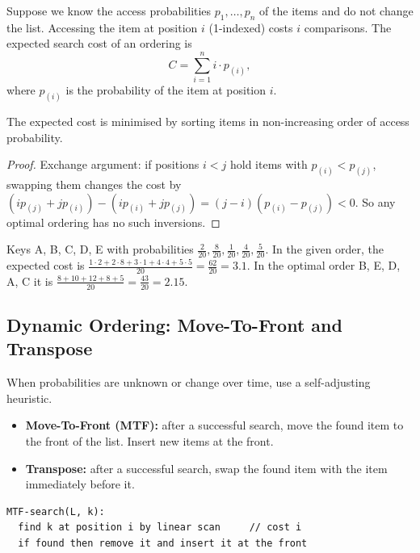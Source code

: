 Suppose we know the access probabilities $p_1, \ldots, p_n$ of the items and do
not change the list. Accessing the item at position $i$ (1-indexed) costs $i$
comparisons. The expected search cost of an ordering is
\[
C = \sum_{i=1}^n i \cdot p_{(i)},
\]
where $p_{(i)}$ is the probability of the item at position $i$.

\begin{theorem}
The expected cost is minimised by sorting items in non-increasing order of
access probability.
\end{theorem}
\begin{proof}
Exchange argument: if positions $i < j$ hold items with $p_{(i)} < p_{(j)}$,
swapping them changes the cost by
$(i p_{(j)} + j p_{(i)}) - (i p_{(i)} + j p_{(j)}) = (j - i)(p_{(i)} - p_{(j)}) < 0$.
So any optimal ordering has no such inversions.
\end{proof}

\begin{example}
Keys A, B, C, D, E with probabilities $\frac2{20}, \frac8{20}, \frac1{20},
\frac{4}{20}, \frac{5}{20}$. In the given order, the expected cost is
$\frac{1\cdot 2 + 2\cdot 8 + 3 \cdot 1 + 4 \cdot 4 + 5\cdot 5}{20} = \frac{62}{20} = 3.1$.
In the optimal order B, E, D, A, C it is
$\frac{8 + 10 + 12 + 8 + 5}{20} = \frac{43}{20} = 2.15$.
\end{example}

\subsection{Dynamic Ordering: Move-To-Front and Transpose}

When probabilities are unknown or change over time, use a self-adjusting
heuristic.

\begin{itemize}
  \item \textbf{Move-To-Front (MTF):} after a successful search, move the found
        item to the front of the list. Insert new items at the front.
  \item \textbf{Transpose:} after a successful search, swap the found item with
        the item immediately before it.
\end{itemize}

\begin{lstlisting}
MTF-search(L, k):
  find k at position i by linear scan     // cost i
  if found then remove it and insert it at the front
\end{lstlisting}

